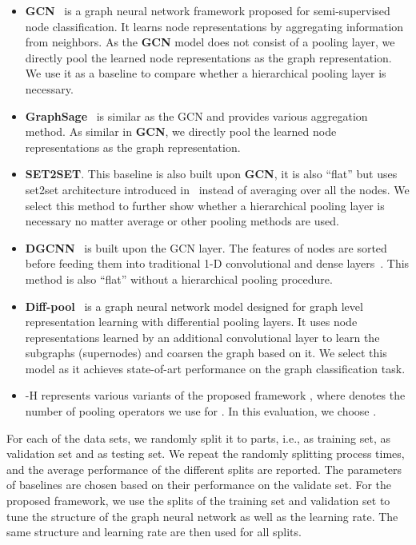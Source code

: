 \documentclass[sigconf]{acmart}
\newcommand{\m}{{\sf {EigenGCN}}}
\begin{document}
\begin{itemize}
    \item {\bf GCN}~\cite{kipf2016semi} is a graph neural network framework proposed for semi-supervised node classification. It learns node representations by aggregating information from neighbors. As the {\bf GCN} model does not consist of a pooling layer, we directly pool the learned node representations as the graph representation. We use it as a baseline to compare whether a hierarchical pooling layer is necessary. 
    \item {\bf GraphSage}~\cite{hamilton2017inductive} is similar as the GCN and provides various aggregation method. As similar in {\bf GCN}, we directly pool the learned node representations as the graph representation. 
    \item {\bf SET2SET}. This baseline is also built upon {\bf GCN}, it is also ``flat'' but uses set2set architecture introduced in~\cite{vinyals2015order} instead of averaging over all the nodes. We select this method to further show whether a hierarchical pooling layer is necessary no matter average or other pooling methods are used. 
    \item {\bf DGCNN}~\cite{zhang2018end} is built upon the GCN layer. The features of nodes are sorted before feeding them into traditional 1-D convolutional and dense layers~\cite{zhang2018end}. This method is also ``flat'' without a hierarchical pooling procedure. 
    \item {\bf Diff-pool}~\cite{ying2018hierarchical} is a graph neural network model designed for graph level representation learning with differential pooling layers. It uses node representations learned by an additional convolutional layer to learn the subgraphs (supernodes) and coarsen the graph based on it. We select this model as it achieves state-of-art performance on the graph classification task.
    \item \m-H represents various variants of the proposed framework \m, where  denotes the number of pooling operators we use for . In this evaluation, we choose .
\end{itemize}

For each of the data sets, we randomly split it to  parts, i.e.,  as training set,  as validation set and  as testing set. We repeat the randomly splitting process  times, and the average performance of the  different splits are reported. The parameters of baselines are chosen based on their performance on the validate set.  For the proposed framework, we use the  splits of the training set and validation set to tune the structure of the graph neural network as well as the learning rate. The same structure and learning rate are then used for all  splits. 
\end{document}

